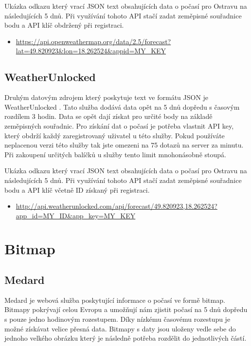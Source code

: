 \documentclass[czech,bachelor,dept460,male,csharp,cpdeclaration]{diploma}
\begin{document}
	Ukázka odkazu který vrací JSON text obsahujících data o počasí pro Ostravu na následujících 5 dnů. Při využívání tohoto API stačí zadat zeměpisné souřadnice bodu a API klíč obdržený při registraci.
	
	\begin{itemize}
		\item \url{https://api.openweathermap.org/data/2.5/forecast?lat=49.820923\&lon=18.262524\&appid=MY\_KEY}
	\end{itemize}
	
	\subsection{WeatherUnlocked}
	
	Druhým datovým zdrojem který poskytuje text ve formátu JSON je WeatherUnlocked \cite{weun}. Tato služba dodává data opět na 5 dnů dopředu s časovým rozdílem 3 hodin. Data se opět dají získat pro určité body na základě zeměpisných souřadnic. Pro získání dat o počasí je potřeba vlastnit API key, který obdrží každý zaregistrovaný uživatel u této služby. Pokud používáte neplacenou verzi této služby tak jste omezeni na 75 dotazů na server za minutu. Při zakoupení určitých balíčků u služby tento limit mnohonásobně stoupá.
	
	Ukázka odkazu který vrací JSON text obsahujících data o počasí pro Ostravu na následujících 5 dnů. Při využívání tohoto API stačí zadat zeměpisné souřadnice bodu a API klíč včetně ID získaný při registraci.
	
	\begin{itemize}
		\item \url{http://api.weatherunlocked.com/api/forecast/49.820923,18.262524?app\_id=MY\_ID\&app\_key=MY\_KEY}
	\end{itemize}
	
	\section{Bitmap}
	\subsection{Medard}
	
	Medard \cite{medard} je webová služba poskytující informace o počasí ve formě bitmap. Bitmapy pokrývají celou Evropu a umožňují nám zjistit počasí na 5 dnů dopředu s pouze jedno hodinovým rozestupem. Díky nízkému časovému rozestupu je možné získávat velice přesná data. Bitmapy s daty jsou uloženy vedle sebe do jednoho velkého obrázku který je následně potřeba rozdělit do jednotlivých částí.
	
\end{document}
